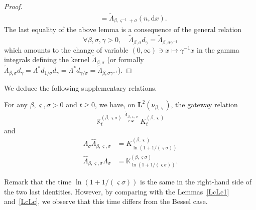 \documentclass[10pt]{amsart}
\theoremstyle{definition}\newtheorem{defi}[theo]{Definition}\newtheorem{rema}[theo]{Remark}\newtheorem{exam}[theo]{Example}\newtheorem{exem}[theo]{Example}\newtheorem{nota}[theo]{Notation}
\newcommand{\iy}{\infty}
\newcommand{\wi}{\widetilde}
\newcommand{\wit}{\widehat}
\newcommand{\dLs}{{\discret{K}}}
\newcommand{\Ls}{K}
\newcommand{\esL}{\mathbf{L}}
\newcommand{\discret}[1]{\mathds{#1}}
\newcommand{\Gate}[3]{#1\stackrel{#2}{\curvearrowright}#3}
\let\oldforall\forall
\renewcommand*{\forall}{\mathrel{\oldforall}}
\newcommand*{\dd}{\mathrm{d}}
\newcommand*{\dx}{\dd x}
\begin{document}
\begin{proof}
\begin{align*}
&=\wi \Lambda_{\beta,\varsigma^{-1}+\sigma}(n,\dx).
\end{align*}
The last equality of the above lemma is a consequence of the general relation
\[
\forall \beta,\sigma,\gamma>0,\quad \wi \Lambda_{\beta,\sigma}d_\gamma=\wi \Lambda_{\beta,\sigma\gamma^{-1}}
\]
which amounts to the change of variable $(0,\iy)\ni x\mapsto \gamma^{-1}x$ in the gamma integrals defining the kernel $ \wi \Lambda_{\beta,\sigma}$ (or formally $\wi \Lambda_{\beta,\sigma}d_\gamma=\Lambda^*d_{1/\sigma}d_\gamma=\Lambda^*d_{\gamma/\sigma}=\wi \Lambda_{\beta,\sigma\gamma^{-1}}$).
\end{proof}

We deduce the following supplementary relations.

\begin{prop}\label{prop:dual-gat}
For any $\beta,\varsigma,\sigma>0$ and $t\geq 0$, we have, on $\esL^2(\nu_{\beta,\varsigma})$, the gateway relation
\[
\Gate{\dLs_{t}^{(\beta,\varsigma\sigma)}}{ \wit \Lambda_{\beta,\varsigma,\sigma} }{\Ls_{t}^{(\beta,\varsigma)}}
\]
and
\begin{align*}
\Lambda_\sigma\wit \Lambda_{\beta,\varsigma,\sigma}&=\Ls_{\ln(1+1/(\varsigma\sigma))}^{(\beta,\varsigma)}\\
\wit \Lambda_{\beta,\varsigma,\sigma}\Lambda_\sigma&=\dLs_{\ln(1+1/(\varsigma\sigma))}^{(\beta,\varsigma\sigma)}.
\end{align*}
\end{prop}

Remark that the time $\ln(1+1/(\varsigma\sigma))$ is the same in the right-hand side of the two last identities. However, by comparing with the Lemmas~\ref{LcLc1} and~\ref{LcLc}, we observe that this time differs from the Bessel case.
\end{document}
